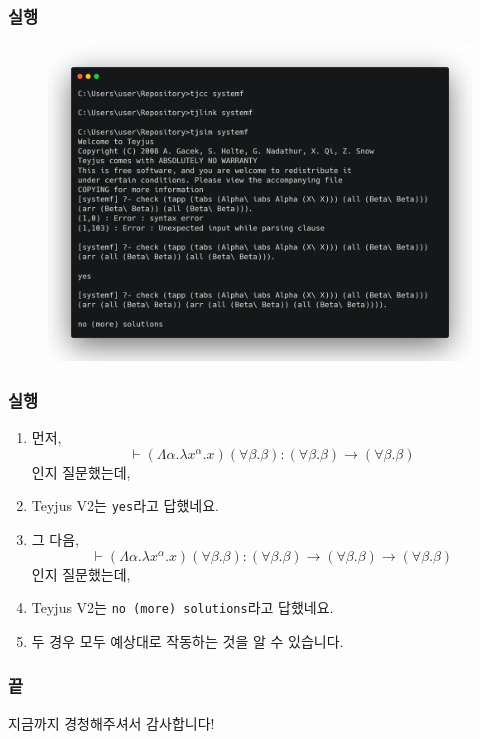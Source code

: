 \documentclass[slidestop,compress,mathserif]{beamer}
\begin{document}
    \begin{frame}
        \frametitle{실행}
        \begin{figure}[h]
            \begin{center}
                \includegraphics[width=1.0\linewidth]{fin.png}
            \end{center}
        \end{figure}
    \end{frame}

    \begin{frame}
        \frametitle{실행}
        \begin{enumerate}
            \item 먼저, $$\vdash \left( \Lambda \alpha . \lambda x^{\alpha} . x \right) \left( \forall \beta . \beta \right) : \left( \forall \beta . \beta \right) \to \left( \forall \beta . \beta \right)$$인지 질문했는데,
            \item Teyjus V2는 \texttt{yes}라고 답했네요.
            \item 그 다음, $$\vdash \left( \Lambda \alpha . \lambda x^{\alpha} . x \right) \left( \forall \beta . \beta \right) : \left( \forall \beta . \beta \right) \to \left( \forall \beta . \beta \right) \to \left( \forall \beta . \beta \right)$$인지 질문했는데,
            \item Teyjus V2는 \texttt{no (more) solutions}라고 답했네요.
            \item 두 경우 모두 예상대로 작동하는 것을 알 수 있습니다.
        \end{enumerate}
    \end{frame}
    
    \begin{frame}[c]
        \frametitle{끝}
        \centering
        지금까지 경청해주셔서 감사합니다!
    \end{frame}
\end{document}

